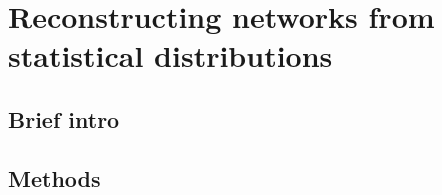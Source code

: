 
\chapter{Reconstructing networks from statistical distributions} %

\label{Chapter-Reconstruction} %


\section{Brief intro}

\section{Methods}

